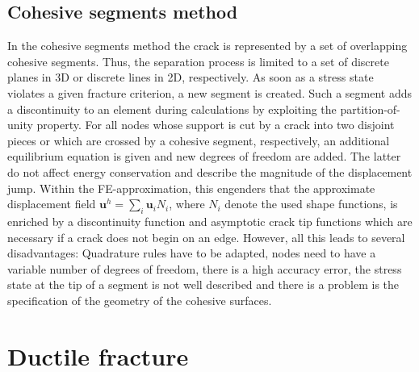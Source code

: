 \subsection{Cohesive segments method} \label{appsec:cohes}
In the cohesive segments method the crack is represented by a set of overlapping cohesive segments. Thus, the separation process is limited to a set of discrete planes in 3D or discrete lines in 2D, respectively. As soon as a stress state violates a given fracture criterion, a new segment is created. Such a segment adds a discontinuity to an element during calculations by exploiting the partition-of-unity property. For all nodes whose support is cut by a crack into two disjoint pieces or which are crossed by a cohesive segment, respectively, an additional equilibrium equation is given and new degrees of freedom are added. The latter do not affect energy conservation and describe the magnitude of the displacement jump. Within the FE-approximation, this engenders that the approximate displacement field $\mathbf{u}^{h}=\sum_{i}\mathbf{u}_{i}N_{i}$, where $N_{i}$ denote the used shape functions, is enriched by a discontinuity function and asymptotic crack tip functions which are necessary if a crack does not begin on an edge. However, all this leads to several disadvantages: Quadrature rules have to be adapted, nodes need to have a variable number of degrees of freedom, there is a high accuracy error, the stress state at the tip of a segment is not well described and there is a problem is the specification of the geometry of the cohesive surfaces. \cite{02_SotA_cohes}\cite{01_SotA_cohes_dyn}

\section{Ductile fracture} \label{appsec:ductile}
